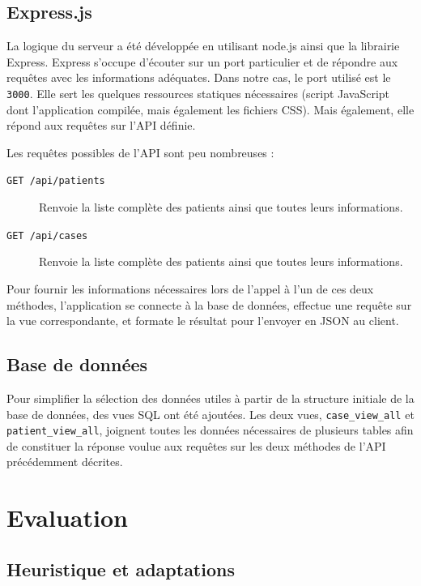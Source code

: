 	\subsection{Express.js}

		La logique du serveur a été développée en utilisant node.js ainsi que la librairie Express. Express s'occupe d'écouter sur un port particulier et de répondre aux requêtes avec les informations adéquates. Dans notre cas, le port utilisé est le \texttt{3000}. Elle sert les quelques ressources statiques nécessaires (script JavaScript dont l'application compilée, mais également les fichiers CSS). Mais également, elle répond aux requêtes sur l'API définie.

		Les requêtes possibles de l'API sont peu nombreuses :

		\begin{description}
			\item[\texttt{GET /api/patients}] Renvoie la liste complète des patients ainsi que toutes leurs informations.
			\item[\texttt{GET /api/cases}] Renvoie la liste complète des patients ainsi que toutes leurs informations.
		\end{description}

		Pour fournir les informations nécessaires lors de l'appel à l'un de ces deux méthodes, l'application se connecte à la base de données, effectue une requête sur la vue correspondante, et formate le résultat pour l'envoyer en JSON au client.

	\subsection{Base de données}

		Pour simplifier la sélection des données utiles à partir de la structure initiale de la base de données, des vues SQL ont été ajoutées.
		Les deux vues, \texttt{case\_view\_all} et \texttt{patient\_view\_all}, joignent toutes les données nécessaires de plusieurs tables afin de constituer la réponse voulue aux requêtes sur les deux méthodes de l'API précédemment décrites.

\section{Evaluation}

	\subsection{Heuristique et adaptations}

